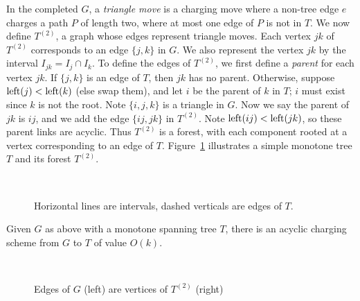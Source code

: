 \documentclass{llncs}
\begin{document}
In the completed $G$, a \emph{triangle move} is a charging move where
a non-tree edge $e$ charges a path $P$ of length two, where at most
one edge of $P$ is not in $T$.  We now define $T^{(2)}$, a graph whose
edges represent triangle moves.  Each vertex $jk$ of $T^{(2)}$
corresponds to an edge $\{j,k\}$ in $G$.  We also represent the vertex
$jk$ by the interval $I_{jk} = I_j \cap I_k$.  To define the edges of
$T^{(2)}$, we first define a \emph{parent} for each vertex $jk$.  If
$\{j,k\}$ is an edge of $T$, then $jk$ has no parent.  Otherwise,
suppose $\mbox{left}(j)<\mbox{left}(k)$ (else swap them), and let $i$ be the
parent of $k$ in $T$; $i$ must exist since $k$ is not the root.  Note
$\{i,j,k\}$ is a triangle in $G$.  Now we say the parent of $jk$ is
$ij$, and we add the edge $\{ij,jk\}$ in $T^{(2)}$.  Note
$\mbox{left}(ij)<\mbox{left}(jk)$, so these parent links are acyclic. Thus
$T^{(2)}$ is a forest, with each component rooted at a vertex
corresponding to an edge of $T$.  Figure~\ref{fig:pages} illustrates a
simple monotone tree $T$ and its forest $T^{(2)}$.

\begin{figure}[ht]
\begin{center}
\mbox{
}
\caption{Horizontal lines are intervals, dashed verticals are edges of $T$.}
\label{fig:pages}
\end{center}
\end{figure}

\begin{lemma}\label{lem:T2scheme} Given $G$ as above with a monotone
spanning tree $T$, there is an acyclic 
charging scheme from $G$ to $T$ of value $O(k)$.
\end{lemma}

\begin{figure}[ht]
\begin{center}
\mbox{
}
\caption{Edges of $G$ (left) are vertices of $T^{(2)}$ (right)}
\label{fig:trees}
\end{center}
\end{figure}
\end{document}
